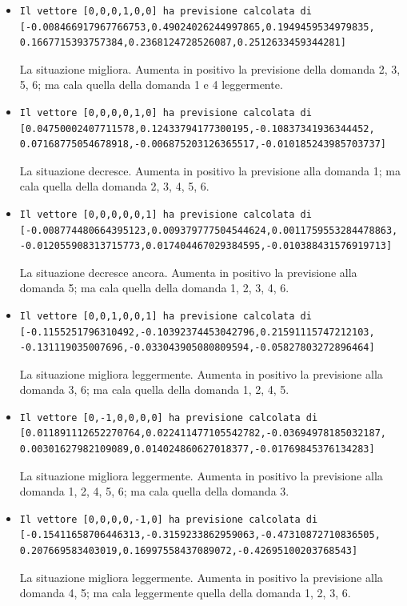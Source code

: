 \begin{itemize}
\item \begin{verbatim}Il vettore [0,0,0,1,0,0] ha previsione calcolata di
[-0.008466917967766753,0.49024026244997865,0.1949459534979835,
0.1667715393757384,0.2368124728526087,0.2512633459344281]
\end{verbatim}
La situazione migliora. Aumenta in positivo la previsione della domanda 2, 3, 5, 6; ma cala quella della domanda 1 e 4 leggermente.

\item \begin{verbatim}Il vettore [0,0,0,0,1,0] ha previsione calcolata di
[0.04750002407711578,0.12433794177300195,-0.10837341936344452,
0.07168775054678918,-0.006875203126365517,-0.010185243985703737] 
\end{verbatim}
La situazione decresce. Aumenta in positivo la previsione alla domanda 1; ma cala quella della domanda 2, 3, 4, 5, 6.

\item \begin{verbatim}Il vettore [0,0,0,0,0,1] ha previsione calcolata di
[-0.008774480664395123,0.009379777504544624,0.0011759553284478863,
-0.012055908313715773,0.017404467029384595,-0.010388431576919713]
\end{verbatim}
La situazione decresce ancora. Aumenta in positivo la previsione alla domanda 5; ma cala quella della domanda 1, 2, 3, 4, 6.

\item \begin{verbatim}Il vettore [0,0,1,0,0,1] ha previsione calcolata di
[-0.1155251796310492,-0.10392374453042796,0.21591115747212103,
-0.131119035007696,-0.033043905080809594,-0.05827803272896464]
\end{verbatim}
La situazione migliora leggermente. Aumenta in positivo la previsione alla domanda 3, 6; ma cala quella della domanda 1, 2, 4, 5.

\item \begin{verbatim}Il vettore [0,-1,0,0,0,0] ha previsione calcolata di
[0.011891112652270764,0.022411477105542782,-0.03694978185032187,
0.00301627982109089,0.014024860627018377,-0.01769845376134283]
\end{verbatim}
La situazione migliora leggermente. Aumenta in positivo la previsione alla domanda 1, 2, 4, 5, 6; ma cala quella della domanda 3.

\item \begin{verbatim}Il vettore [0,0,0,0,-1,0] ha previsione calcolata di
[-0.15411658706446313,-0.3159233862959063,-0.47310872710836505,
0.207669583403019,0.16997558437089072,-0.42695100203768543]
\end{verbatim}
La situazione migliora leggermente. Aumenta in positivo la previsione alla domanda 4, 5; ma cala leggermente quella della domanda 1, 2, 3, 6.


\end{itemize}
